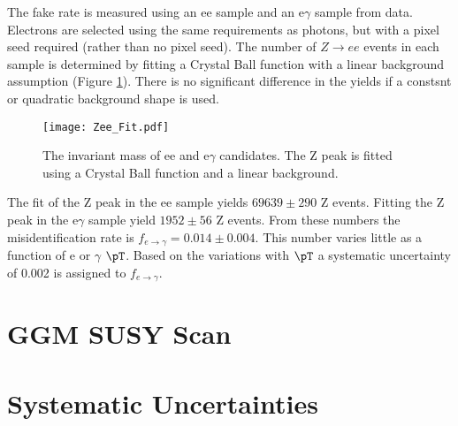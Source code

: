 The fake rate is measured using an ee sample and an e$\gamma$ sample from data.
Electrons are selected using the same requirements as photons, but with a pixel
seed required (rather than no pixel seed). The number of $Z\rightarrow ee$
events in each sample is determined by fitting a Crystal Ball function with a
linear background assumption (Figure \ref{fig:Zee_Fit}). There is no significant
difference in the yields if a constsnt or quadratic background shape is used. \\

\begin{figure}
\begin{center}
\texttt{[image: Zee\_Fit.pdf]}
\end{center}
\caption{The invariant mass of ee and e$\gamma$ candidates. The Z peak is fitted
using a Crystal Ball function and a linear background.}
\label{fig:Zee_Fit}
\end{figure}

The fit of the Z peak in the ee sample yields $69639 \pm 290$ Z events. Fitting
the Z peak in the e$\gamma$ sample yield $1952\pm56$ Z events. From these
numbers the misidentification rate is $f_{e\rightarrow\gamma} = 0.014\pm0.004$.
This number varies little as a function of e or $\gamma$ $\pT$. Based on the
variations with $\pT$ a systematic uncertainty of 0.002 is assigned to
$f_{e\rightarrow\gamma}$. 

\section{GGM SUSY Scan}

\section{Systematic Uncertainties}
